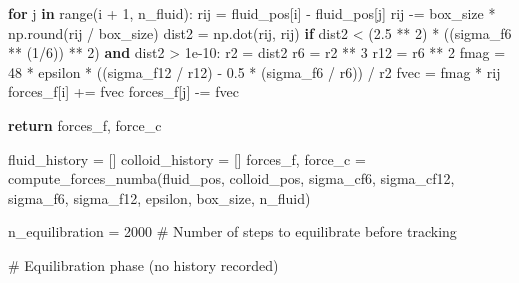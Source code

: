 \documentclass[
  letterpaper,
  enabledeprecatedfontcommands]{report}
\newenvironment{Shaded}{\begin{snugshade}}{\end{snugshade}}
\newcommand{\BuiltInTok}[1]{\textcolor[rgb]{0.00,0.23,0.31}{#1}}
\newcommand{\CommentTok}[1]{\textcolor[rgb]{0.37,0.37,0.37}{#1}}
\newcommand{\ControlFlowTok}[1]{\textcolor[rgb]{0.00,0.23,0.31}{\textbf{#1}}}
\newcommand{\DecValTok}[1]{\textcolor[rgb]{0.68,0.00,0.00}{#1}}
\newcommand{\FloatTok}[1]{\textcolor[rgb]{0.68,0.00,0.00}{#1}}
\newcommand{\KeywordTok}[1]{\textcolor[rgb]{0.00,0.23,0.31}{\textbf{#1}}}
\newcommand{\NormalTok}[1]{\textcolor[rgb]{0.00,0.23,0.31}{#1}}
\newcommand{\OperatorTok}[1]{\textcolor[rgb]{0.37,0.37,0.37}{#1}}
\begin{document}
\begin{Shaded}
\begin{Highlighting}[]
        \ControlFlowTok{for}\NormalTok{ j }\KeywordTok{in} \BuiltInTok{range}\NormalTok{(i }\OperatorTok{+} \DecValTok{1}\NormalTok{, n\_fluid):}
\NormalTok{            rij }\OperatorTok{=}\NormalTok{ fluid\_pos[i] }\OperatorTok{{-}}\NormalTok{ fluid\_pos[j]}
\NormalTok{            rij }\OperatorTok{{-}=}\NormalTok{ box\_size }\OperatorTok{*}\NormalTok{ np.}\BuiltInTok{round}\NormalTok{(rij }\OperatorTok{/}\NormalTok{ box\_size)}
\NormalTok{            dist2 }\OperatorTok{=}\NormalTok{ np.dot(rij, rij)}
            \ControlFlowTok{if}\NormalTok{ dist2 }\OperatorTok{\textless{}}\NormalTok{ (}\FloatTok{2.5} \OperatorTok{**} \DecValTok{2}\NormalTok{) }\OperatorTok{*}\NormalTok{ ((sigma\_f6 }\OperatorTok{**}\NormalTok{ (}\DecValTok{1}\OperatorTok{/}\DecValTok{6}\NormalTok{)) }\OperatorTok{**} \DecValTok{2}\NormalTok{) }\KeywordTok{and}\NormalTok{ dist2 }\OperatorTok{\textgreater{}} \FloatTok{1e{-}10}\NormalTok{:}
\NormalTok{                r2 }\OperatorTok{=}\NormalTok{ dist2}
\NormalTok{                r6 }\OperatorTok{=}\NormalTok{ r2 }\OperatorTok{**} \DecValTok{3}
\NormalTok{                r12 }\OperatorTok{=}\NormalTok{ r6 }\OperatorTok{**} \DecValTok{2}
\NormalTok{                fmag }\OperatorTok{=} \DecValTok{48} \OperatorTok{*}\NormalTok{ epsilon }\OperatorTok{*}\NormalTok{ ((sigma\_f12 }\OperatorTok{/}\NormalTok{ r12) }\OperatorTok{{-}} \FloatTok{0.5} \OperatorTok{*}\NormalTok{ (sigma\_f6 }\OperatorTok{/}\NormalTok{ r6)) }\OperatorTok{/}\NormalTok{ r2}
\NormalTok{                fvec }\OperatorTok{=}\NormalTok{ fmag }\OperatorTok{*}\NormalTok{ rij}
\NormalTok{                forces\_f[i] }\OperatorTok{+=}\NormalTok{ fvec}
\NormalTok{                forces\_f[j] }\OperatorTok{{-}=}\NormalTok{ fvec}

    \ControlFlowTok{return}\NormalTok{ forces\_f, force\_c}

\NormalTok{    fluid\_history }\OperatorTok{=}\NormalTok{ []}
\NormalTok{colloid\_history }\OperatorTok{=}\NormalTok{ []}
\NormalTok{forces\_f, force\_c }\OperatorTok{=}\NormalTok{ compute\_forces\_numba(fluid\_pos, colloid\_pos, sigma\_cf6, sigma\_cf12, sigma\_f6, sigma\_f12, epsilon, box\_size, n\_fluid)}

\NormalTok{n\_equilibration }\OperatorTok{=} \DecValTok{2000}  \CommentTok{\# Number of steps to equilibrate before tracking}

\CommentTok{\# Equilibration phase (no history recorded)}


\end{Highlighting}
\end{Shaded}
\end{document}
